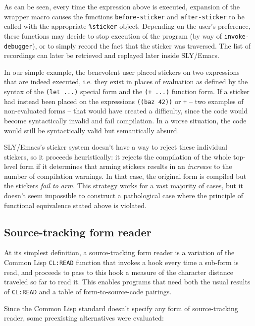 \documentclass[sigconf]{acmart}
\begin{document}
As can be seen, every time the expression above is executed, expansion
of the wrapper macro causes the functions \texttt{before-sticker} and
\texttt{after-sticker} to be called with the appropriate
\texttt{\%sticker} object.  Depending on the user's preference, these
functions may decide to stop execution of the program (by way of
\texttt{invoke-debugger}), or to simply record the fact that the
sticker was traversed.  The list of recordings can later be retrieved
and replayed later inside SLY/Emacs.

In our simple example, the benevolent user placed stickers on two
expressions that are indeed executed, i.e. they exist in places of
evaluation as defined by the syntax of the \texttt{(let ...)}  special
form and the \texttt{(+ ...)} function form.  If a sticker had instead
been placed on the expressions \texttt{((baz 42))} or \texttt{+} --
two examples of non-evaluated forms -- that would have created a
difficulty, since the code would become syntactically invalid and fail
compilation.  In a worse situation, the code would still be
syntactically valid but semantically absurd.

SLY/Emacs's sticker system doesn't have a way to reject these
individual stickers, so it proceeds heuristically: it rejects the
compilation of the whole top-level form if it determines that arming
stickers results in an \emph{increase} to the number of compilation
warnings.  In that case, the original form is compiled but the
stickers \emph{fail to arm}.  This strategy works for a vast majority
of cases, but it doesn't seem impossible to construct a pathological
case where the principle of functional equivalence stated above is
violated.

\subsection{Source-tracking form reader}\label{st-reader}

At its simplest definition, a source-tracking form reader is a
variation of the Common Lisp \texttt{CL:READ} function that invokes a
hook every time a sub-form is read, and proceeds to pass to this hook
a measure of the character distance traveled so far to read it.  This
enables programs that need both the usual results of \texttt{CL:READ}
and a table of form-to-source-code pairings.

Since the Common Lisp standard doesn't specify any form of
source-tracking reader, some preexisting alternatives were evaluated:
\end{document}
